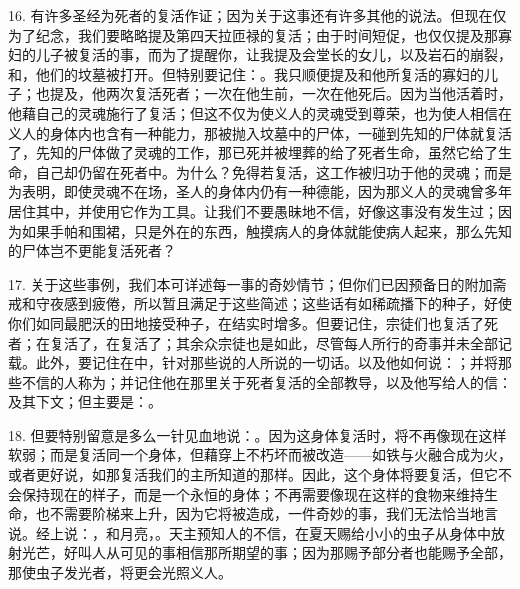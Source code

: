 16. 有许多圣经为死者的复活作证；因为关于这事还有许多其他的说法。但现在仅为了纪念，我们要略略提及第四天拉匝禄的复活；由于时间短促，也仅仅提及那寡妇的儿子被复活的事，而为了提醒你，让我提及会堂长的女儿，以及岩石的崩裂，和，他们的坟墓被打开。但特别要记住：。我只顺便提及和他所复活的寡妇的儿子；也提及，他两次复活死者；一次在他生前，一次在他死后。因为当他活着时，他藉自己的灵魂施行了复活；但这不仅为使义人的灵魂受到尊荣，也为使人相信在义人的身体内也含有一种能力，那被抛入坟墓中的尸体，一碰到先知的尸体就复活了，先知的尸体做了灵魂的工作，那已死并被埋葬的给了死者生命，虽然它给了生命，自己却仍留在死者中。为什么？免得若复活，这工作被归功于他的灵魂；而是为表明，即使灵魂不在场，圣人的身体内仍有一种德能，因为那义人的灵魂曾多年居住其中，并使用它作为工具。让我们不要愚昧地不信，好像这事没有发生过；因为如果手帕和围裙，只是外在的东西，触摸病人的身体就能使病人起来，那么先知的尸体岂不更能复活死者？\par

17. 关于这些事例，我们本可详述每一事的奇妙情节；但你们已因预备日的附加斋戒和守夜感到疲倦，所以暂且满足于这些简述；这些话有如稀疏播下的种子，好使你们如同最肥沃的田地接受种子，在结实时增多。但要记住，宗徒们也复活了死者；在复活了，在复活了；其余众宗徒也是如此，尽管每人所行的奇事并未全部记载。此外，要记住在中，针对那些说的人所说的一切话。以及他如何说：；并将那些不信的人称为；并记住他在那里关于死者复活的全部教导，以及他写给人的信：及其下文；但主要是：。\par

18. 但要特别留意是多么一针见血地说：。因为这身体复活时，将不再像现在这样软弱；而是复活同一个身体，但藉穿上不朽坏而被改造——如铁与火融合成为火，或者更好说，如那复活我们的主所知道的那样。因此，这个身体将要复活，但它不会保持现在的样子，而是一个永恒的身体；不再需要像现在这样的食物来维持生命，也不需要阶梯来上升，因为它将被造成，一件奇妙的事，我们无法恰当地言说。经上说：，和月亮，。天主预知人的不信，在夏天赐给小小的虫子从身体中放射光芒，好叫人从可见的事相信那所期望的事；因为那赐予部分者也能赐予全部，那使虫子发光者，将更会光照义人。\par

